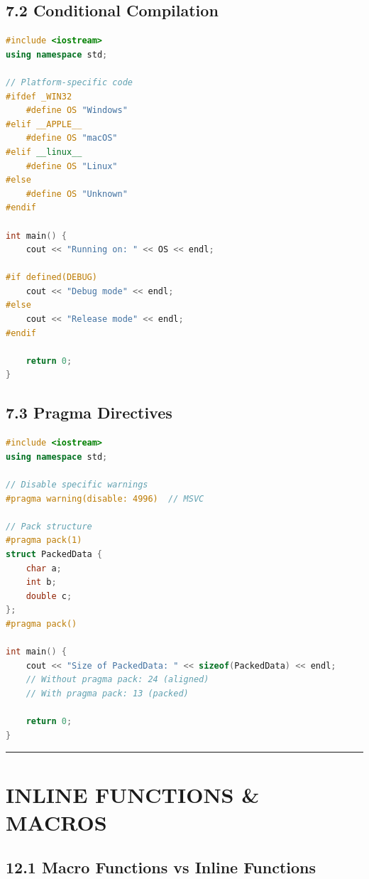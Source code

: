 \hypertarget{conditional-compilation}{%
\section{7.2 Conditional Compilation}\label{conditional-compilation}}

\begin{lstlisting}[language={C++}]
#include <iostream>
using namespace std;

// Platform-specific code
#ifdef _WIN32
    #define OS "Windows"
#elif __APPLE__
    #define OS "macOS"
#elif __linux__
    #define OS "Linux"
#else
    #define OS "Unknown"
#endif

int main() {
    cout << "Running on: " << OS << endl;
    
#if defined(DEBUG)
    cout << "Debug mode" << endl;
#else
    cout << "Release mode" << endl;
#endif
    
    return 0;
}
\end{lstlisting}

\hypertarget{pragma-directives}{%
\section{7.3 Pragma Directives}\label{pragma-directives}}

\begin{lstlisting}[language={C++}]
#include <iostream>
using namespace std;

// Disable specific warnings
#pragma warning(disable: 4996)  // MSVC

// Pack structure
#pragma pack(1)
struct PackedData {
    char a;
    int b;
    double c;
};
#pragma pack()

int main() {
    cout << "Size of PackedData: " << sizeof(PackedData) << endl;
    // Without pragma pack: 24 (aligned)
    // With pragma pack: 13 (packed)
    
    return 0;
}
\end{lstlisting}

\begin{center}\rule{0.5\linewidth}{0.5pt}\end{center}

\hypertarget{inline-functions-macros}{%
\chapter{INLINE FUNCTIONS \& MACROS}\label{inline-functions-macros}}

\hypertarget{macro-functions-vs-inline-functions}{%
\section{12.1 Macro Functions vs Inline
Functions}\label{macro-functions-vs-inline-functions}}

